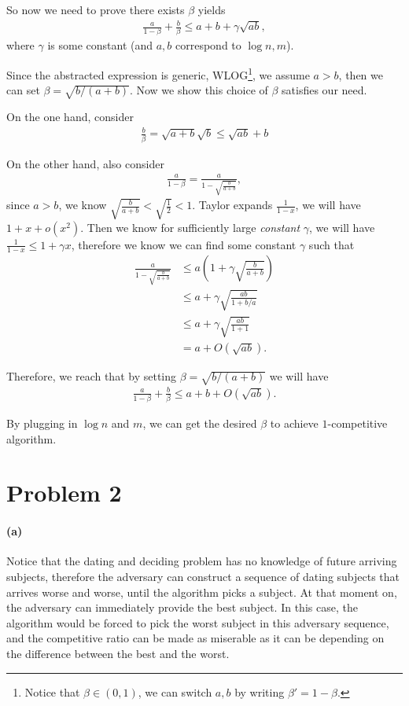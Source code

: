 \documentclass[12pt]{article}
\begin{document}
So now we need to prove there exists $\beta$ yields 
\begin{align*}
\frac{a}{1-\beta} + \frac{b}{\beta} \leq a + b + \gamma \sqrt{ab},
\end{align*}
where $\gamma$ is some constant (and $a, b$ correspond to $\log n, m$).

Since the abstracted expression is generic, WLOG\footnote{Notice that $\beta\in(0,1)$, we can switch $a, b$ by writing $\beta' = 1-\beta$.}, we assume $a >b$, then we can set $\beta = \sqrt{b/(a+b)}$. Now we show this choice of $\beta$ satisfies our need. 

On the one hand, consider 
\begin{align*}
\frac{b}{\beta} = \sqrt{a+b}\sqrt{b} \leq \sqrt{ab} + b
\end{align*}

On the other hand, also consider 
\begin{align*}
\frac{a}{1-\beta} = \frac{a}{1-\sqrt{\frac{b}{a+b}}},
\end{align*}
since $a > b$, we know $\sqrt{\frac{b}{a+b}} < \sqrt{\frac{1}{2}} < 1$. Taylor expands $\frac{1}{1-x}$, we will have $1 + x + o(x^2)$. Then we know for sufficiently large \emph{constant} $\gamma$, we will have $\frac{1}{1-x} \leq 1 + \gamma x$, therefore we know we can find some constant $\gamma$ such that 
\begin{align*}
\frac{a}{1-\sqrt{\frac{b}{a+b}}} &\leq a \left(1 + \gamma \sqrt{\frac{b}{a+b}}\right)\\
&\leq a + \gamma \sqrt{\frac{ab}{1+b/a}}\\
&\leq a + \gamma \sqrt{\frac{ab}{1+1}}\\
&= a + O(\sqrt{ab}).
\end{align*}

Therefore, we reach that by setting $\beta = \sqrt{b/(a+b)}$ we will have
\begin{align*}
\frac{a}{1-\beta} + \frac{b}{\beta} \leq a + b + O(\sqrt{ab}).
\end{align*}

By plugging in $\log n$ and $m$, we can get the desired $\beta$ to achieve $1$-competitive algorithm. 
\pagebreak
\section*{Problem 2}
\paragraph{(a)} Notice that the dating and deciding problem has no knowledge of future arriving subjects, therefore the adversary can construct a sequence of dating subjects that arrives worse and worse, until the algorithm picks a subject. At that moment on, the adversary can immediately provide the best subject. In this case, the algorithm would be forced to pick the worst subject in this adversary sequence, and the competitive ratio can be made as miserable as it can be depending on the difference between the best and the worst. 
\end{document}
